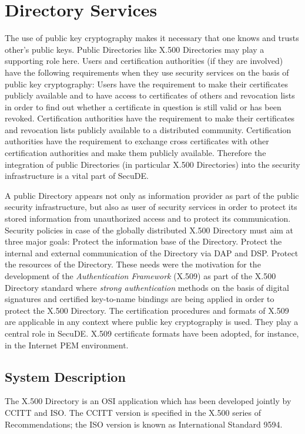 \section{Directory Services}
\thispagestyle{myheadings}
\label{ds}
The use of public key cryptography makes it necessary that one knows 
and trusts other's public keys. Public Directories like X.500 Directories
may play a supporting role here. Users and certification authorities
(if they are involved) have the following requirements when they use security
services on the basis of public key cryptography:
\bi
\m Users have the requirement to make their certificates publicly
available and to have access to certificates of others and revocation lists
in order to find out whether a certificate in question is still valid or
has been revoked.
\m Certification authorities have the requirement to make their certificates and revocation
lists publicly available to a distributed community.
\m Certification authorities have the requirement to exchange cross certificates 
   with other certification authorities and make
   them publicly available.
\ei
Therefore the integration of public Directories (in particular X.500 Directories)
into the security infrastructure is a vital part of SecuDE.

A public Directory appears not only as information provider as part of the public security 
infrastructure, but also as user of security services in order to
protect its stored information from unauthorized access and to protect its 
communication. Security policies in case of the globally distributed X.500 Directory
must aim at three major goals:
\be
\m Protect the information base of the Directory.
\m Protect the internal and external communication of the Directory
   via DAP and DSP.
\m Protect the resources of the Directory.
\ee
These needs were the motivation for the development of the {\em Authentication
Framework} (X.509) as part of the X.500 Directory standard where {\em strong authentication} 
methods on the basis of digital signatures and certified key-to-name bindings
are being applied in order to protect the X.500 Directory. The certification procedures
and formats of X.509 are applicable in any context where public key cryptography is used. 
They play a central role in SecuDE. X.509 certificate
formats have been adopted, for instance, in the Internet PEM environment.

\subsection{System Description}
The X.500 Directory is an OSI application which has been developed
jointly by CCITT and ISO. The CCITT version is specified in the
X.500 series of Recommendations; the ISO version is known as
International Standard 9594.

